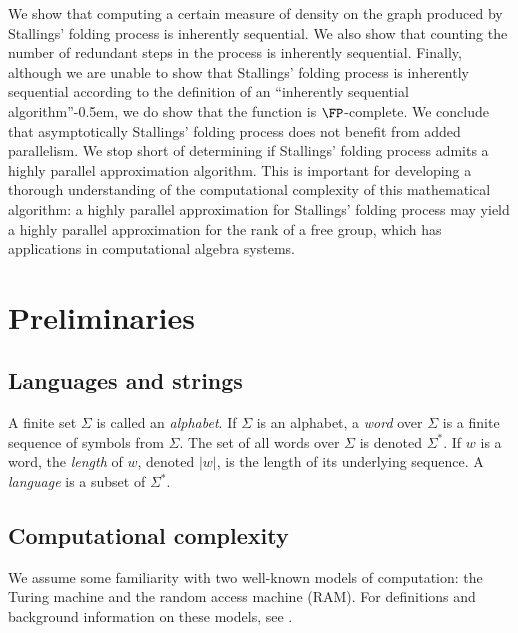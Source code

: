 \documentclass{article}
\begin{document}
%
We show that computing a certain measure of density on the graph produced by Stallings' folding process is inherently sequential.
We also show that counting the number of redundant steps in the process is inherently sequential.
Finally, although we are unable to show that Stallings' folding process is inherently sequential according to the definition of an ``inherently sequential algorithm''\kern-0.5em, we do show that the function is $\FP$-complete.
We conclude that asymptotically Stallings' folding process does not benefit from added parallelism.
We stop short of determining if Stallings' folding process admits a highly parallel approximation algorithm.
This is important for developing a thorough understanding of the computational complexity of this mathematical algorithm: a highly parallel approximation for Stallings' folding process may yield a highly parallel approximation for the rank of a free group, which has applications in computational algebra systems.


\section{Preliminaries}

\subsection{Languages and strings}

A finite set $\Sigma$ is called an \emph{alphabet}.
If $\Sigma$ is an alphabet, a \emph{word} over $\Sigma$ is a finite sequence of symbols from $\Sigma$.
The set of all words over $\Sigma$ is denoted $\Sigma^*$.
If $w$ is a word, the \emph{length} of $w$, denoted $|w|$, is the length of its underlying sequence.
A \emph{language} is a subset of $\Sigma^*$.

\subsection{Computational complexity}

We assume some familiarity with two well-known models of computation: the Turing machine and the random access machine (RAM).
For definitions and background information on these models, see \autocite{savage98}.
\end{document}
